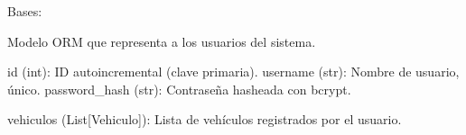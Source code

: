 \documentclass[letterpaper,10pt,spanish]{sphinxmanual}
\begin{document}
\begin{fulllineitems}
\label{\detokenize{endpoints:main.Usuario}}
\pysigstartsignatures
\pysiglinewithargsret
{}
{}
{}
\pysigstopsignatures
\sphinxAtStartPar
Bases: {\hyperref[\detokenize{modelos:main.Base}]{}}

\sphinxAtStartPar
Modelo ORM que representa a los usuarios del sistema.
\begin{description}
\sphinxAtStartPar
id (int): ID autoincremental (clave primaria).
username (str): Nombre de usuario, único.
password\_hash (str): Contraseña hasheada con bcrypt.

\sphinxAtStartPar
vehiculos (List{[}Vehiculo{]}): Lista de vehículos registrados por el usuario.

\end{description}

\begin{fulllineitems}
\label{\detokenize{endpoints:main.Usuario.id}}
\pysigstartsignatures
\pysigline
{}
\pysigstopsignatures
\end{fulllineitems}


\begin{fulllineitems}
\label{\detokenize{endpoints:main.Usuario.password_hash}}
\pysigstartsignatures
\pysigline
{}
\pysigstopsignatures
\end{fulllineitems}


\begin{fulllineitems}
\label{\detokenize{endpoints:main.Usuario.username}}
\pysigstartsignatures
\pysigline
{}
\pysigstopsignatures
\end{fulllineitems}


\begin{fulllineitems}
\label{\detokenize{endpoints:main.Usuario.vehiculos}}
\pysigstartsignatures
\pysigline
{}
\pysigstopsignatures
\end{fulllineitems}


\end{fulllineitems}
\end{document}
